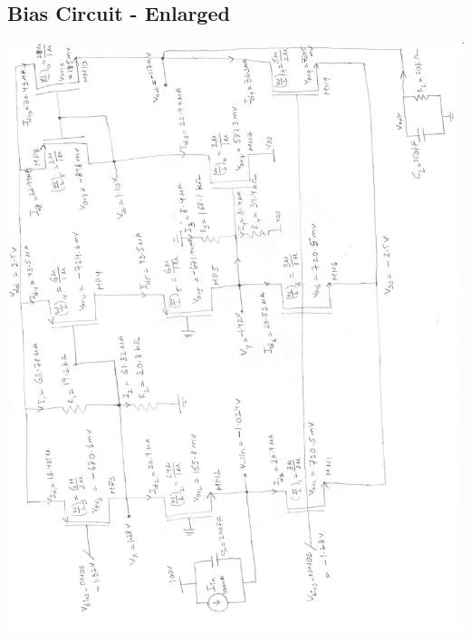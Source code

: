 \documentclass[12pt,a4paper]{article}
\begin{document}
\pagebreak

\subsection{Bias Circuit - Enlarged}
\includegraphics[page=2, width=\textwidth]{project_schematic.pdf}

\pagebreak
\end{document}
